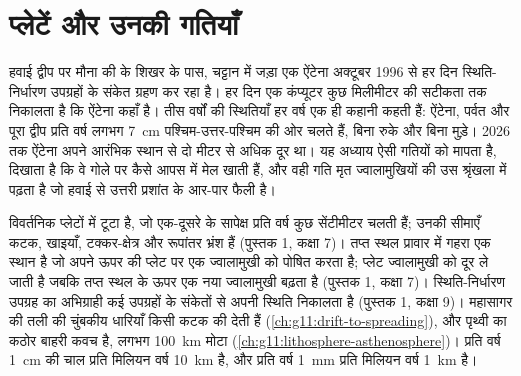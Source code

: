 \chapter{प्लेटें और उनकी गतियाँ}\label{ch:g11:plate-motions}

हवाई द्वीप पर मौना की के शिखर के पास, चट्टान में जड़ा एक ऐंटेना
अक्टूबर 1996 से हर दिन स्थिति-निर्धारण उपग्रहों के संकेत ग्रहण कर रहा है।
हर दिन एक कंप्यूटर कुछ मिलीमीटर की सटीकता तक निकालता है कि ऐंटेना कहाँ है।
तीस वर्षों की स्थितियाँ हर वर्ष एक ही कहानी कहती हैं: ऐंटेना,
पर्वत और पूरा द्वीप प्रति वर्ष लगभग \qty{7}{cm} पश्चिम-उत्तर-पश्चिम की ओर
चलते हैं, बिना रुके और बिना मुड़े। 2026 तक ऐंटेना
अपने आरंभिक स्थान से दो मीटर से अधिक दूर था। यह अध्याय
ऐसी गतियों को मापता है, दिखाता है कि वे गोले पर कैसे आपस में मेल खाती हैं, और वही
गति मृत ज्वालामुखियों की उस श्रृंखला में पढ़ता है जो हवाई से उत्तरी प्रशांत
के आर-पार फैली है।

\begin{recall}
 विवर्तनिक प्लेटों में टूटा है, जो एक-दूसरे के सापेक्ष
प्रति वर्ष कुछ सेंटीमीटर चलती हैं; उनकी सीमाएँ कटक, खाइयाँ,
टक्कर-क्षेत्र और रूपांतर भ्रंश हैं (पुस्तक 1, कक्षा 7)। तप्त स्थल
प्रावार में गहरा एक स्थान है जो अपने ऊपर की प्लेट पर एक ज्वालामुखी को पोषित करता है; प्लेट
ज्वालामुखी को दूर ले जाती है जबकि तप्त स्थल के ऊपर एक नया ज्वालामुखी बढ़ता है (पुस्तक 1,
कक्षा 7)। स्थिति-निर्धारण उपग्रह का अभिग्राही कई उपग्रहों के संकेतों से
अपनी स्थिति निकालता है (पुस्तक 1, कक्षा 9)। महासागर की तली की चुंबकीय धारियाँ
किसी कटक की  देती हैं
(\cref{ch:g11:drift-to-spreading}), और  पृथ्वी का कठोर बाहरी
कवच है, लगभग \qty{100}{km} मोटा
(\cref{ch:g11:lithosphere-asthenosphere})। प्रति वर्ष \qty{1}{cm} की चाल
प्रति मिलियन वर्ष \qty{10}{km} है, और प्रति वर्ष \qty{1}{mm} प्रति
मिलियन वर्ष \qty{1}{km} है।
\end{recall}

